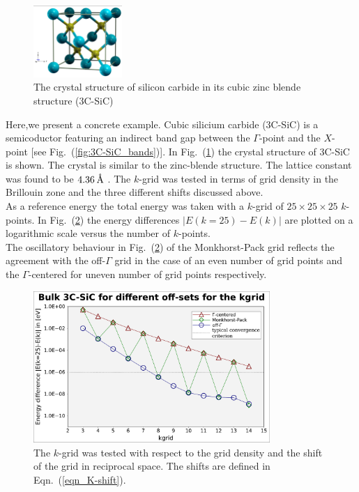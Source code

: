 \clearpage
\newpage
%
\begin{figure}
\centering
 \includegraphics[width=0.30\textwidth]{./3C_SiC.png}
 \caption{The crystal structure of silicon carbide in its cubic zinc blende structure (3C-SiC)}
 \label{fig:crystal}
\end{figure}
Here,we present a concrete example. Cubic silicium carbide (3C-SiC) is a semicoductor featuring an indirect band gap between the $\Gamma$-point and the $X$-point [see Fig.~(\ref{fig:3C-SiC_bands})]. In Fig.~(\ref{fig:crystal}) the crystal structure of 3C-SiC is shown. The crystal is similar to the zinc-blende structure. The lattice constant was found to be $4.36{\hspace{.2em}}\text{\AA}$ \cite{itoh1997scg}.%
The $k$-grid was tested in terms of grid density in the Brillouin zone and the three different shifts discussed above.\\
As a reference energy the total energy was taken with a $k$-grid of $25 \times 25 \times 25$ $k$-points. In Fig.~(\ref{fig:aims_kgrid}) the energy differences $\left|E(k=25)-E(k) \right|$ are plotted on a logarithmic scale versus the number of $k$-points.\\%
The oscillatory behaviour in Fig.~(\ref{fig:aims_kgrid}) of the Monkhorst-Pack grid reflects the agreement with the off-$\Gamma$ grid in the case of an even number of grid points and the $\Gamma$-centered for uneven number of grid points respectively.\\
%
%
\begin{figure}[h]
\centering
 \includegraphics[width=0.80\textwidth]{./kgrid_plot_man.pdf}
 \caption{The $k$-grid was tested with respect to the grid density and the shift of the grid in reciprocal space. The shifts are defined in Eqn.~(\ref{eqn_K-shift}).}
 \label{fig:aims_kgrid}
\end{figure}%
